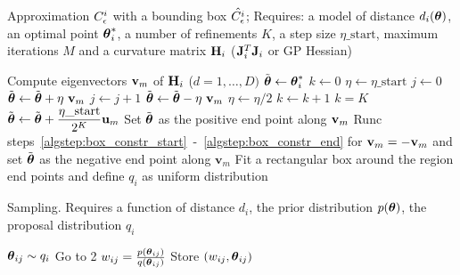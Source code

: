 \begin{algorithm}[!ht]
	\caption{Approximation \(C^i_{\epsilon}\) with a bounding box \(\hat{C^i_{\epsilon}}\); 
  Requires: a model of distance \(d_i(\boldsymbol{\theta})\), 
  an optimal point \(\boldsymbol{\theta}_i^*\), 
  a number of refinements \(K\), 
  a step size \(\eta\_\text{start}\), 
  maximum iterations \(M\) and 
  a curvature matrix \(\mathbf{H}_i\) (\(\mathbf{J}_i^T\mathbf{J}_i \) or GP Hessian)}\label{alg:region_construction}
	\begin{algorithmic}[1]
	\State Compute eigenvectors \(\mathbf{v}_{m}\) of \(\mathbf{H}_i\) {\scriptsize (\(d = 1,\ldots,D)\)}
		\State \(\Tilde{\boldsymbol{\theta}} \gets \boldsymbol{\theta}_i^*\) \label{algstep:box_constr_start}
		\State \(k \gets 0\)
		\State \(\eta \gets \eta\_\text{start}\) 
		\Repeat
          \State \(j \gets 0\)
        	\Repeat
            \State \(\Tilde{\boldsymbol{\theta}} \gets \Tilde{\boldsymbol{\theta}} + \eta \ \mathbf{v}_{m}\) 
            \State \(j \gets j + 1\)
        	 
        	\State \(\Tilde{\boldsymbol{\theta}} \gets \Tilde{\boldsymbol{\theta}} - \eta \ \mathbf{v}_{m}\)
        	\State \(\eta \gets \eta/2\) 
        	\State \(k \gets k + 1\)
      \Until \(k = K\)
       
        \State \(\Tilde{\boldsymbol{\theta}} \gets \Tilde{\boldsymbol{\theta}} + \dfrac{\eta\_{\text{start}}}{2^K} \mathbf{u}_m\) 
      \EndIf \label{algstep:box_constr_end}
    	\State Set \(\Tilde{\boldsymbol{\theta}}\) as the positive end point along \(\mathbf{v}_m\)
    	\State Runc steps~\ref{algstep:box_constr_start}~-~\ref{algstep:box_constr_end} for \(\mathbf{v}_m = - \mathbf{v}_m\) and set \(\Tilde{\boldsymbol{\theta}}\) as the negative end point along \(\mathbf{v}_{m}\)
	\EndFor
	\State Fit a rectangular box around the region end points and define \(q_i\) as uniform distribution
	\end{algorithmic}
\end{algorithm}



\begin{algorithm}[H]
    \centering
    \caption{Sampling. Requires a function of distance \(d_i\), the prior distribution \(p(\boldsymbol{\theta})\), the proposal distribution \(q_i\)}\label{alg:sampling_GB}
    \begin{algorithmic}[1]
      \State \(\boldsymbol{\theta}_{ij} \sim q_i\)
            \State Go to 2 
          \Else {}
            \State \(w_{ij} = \frac{p(\boldsymbol{\theta}_{ij})}{q(\boldsymbol{\theta}_{ij})}\) 
            \State Store \((w_{ij}, \boldsymbol{\theta}_{ij})\) 
          \EndIf
    \end{algorithmic}
\end{algorithm}
